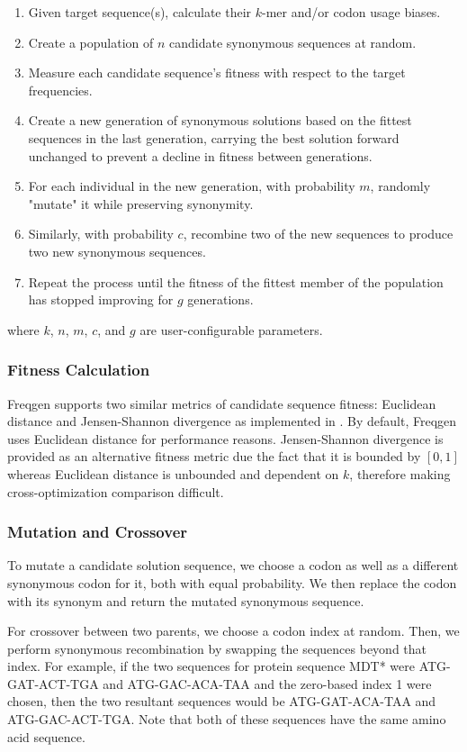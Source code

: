 \documentclass{article}
\begin{document}
\begin{enumerate}
    \item Given target sequence(s), calculate their $k$-mer and/or codon usage biases.
    \item Create a population of $n$ candidate synonymous sequences at random.
    \item Measure each candidate sequence's fitness with respect to the target frequencies.
    \item Create a new generation of synonymous solutions based on the fittest sequences in the last generation, carrying the best solution forward unchanged to prevent a decline in fitness between generations.
    \item For each individual in the new generation, with probability $m$, randomly "mutate" it while preserving synonymity.
    \item Similarly, with probability $c$, recombine two of the new sequences to produce two new synonymous sequences.
    \item Repeat the process until the fitness of the fittest member of the population has stopped improving for $g$ generations.
\end{enumerate}

where $k$, $n$, $m$, $c$, and $g$ are user-configurable parameters.

\subsubsection{Fitness Calculation}
Freqgen supports two similar metrics of candidate sequence fitness: Euclidean distance and Jensen-Shannon divergence as implemented in \cite{dit}. By default, Freqgen uses Euclidean distance for performance reasons. Jensen-Shannon divergence is provided as an alternative fitness metric due the fact that it is bounded by $[0,1]$ whereas Euclidean distance is unbounded and dependent on $k$, therefore making cross-optimization comparison difficult.

\subsubsection{Mutation and Crossover}
To mutate a candidate solution sequence, we choose a codon as well as a different synonymous codon for it, both with equal probability. We then replace the codon with its synonym and return the mutated synonymous sequence.

For crossover between two parents, we choose a codon index at random. Then, we perform synonymous recombination by swapping the sequences beyond that index. For example, if the two sequences for protein sequence MDT* were ATG-GAT-ACT-TGA and ATG-GAC-ACA-TAA and the zero-based index 1 were chosen, then the two resultant sequences would be ATG-GAT-ACA-TAA and ATG-GAC-ACT-TGA. Note that both of these sequences have the same amino acid sequence.
\end{document}
